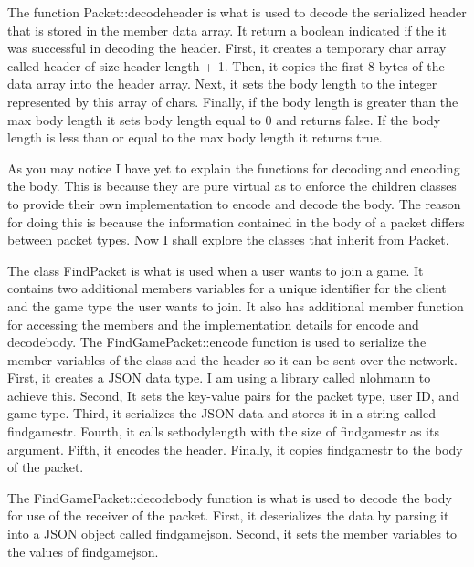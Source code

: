 \documentclass[conference]{IEEEtran}
\begin{document}
The function Packet::decode\textunderscore header is what is used to decode the serialized header that is stored in the member data array.
It return a boolean indicated if the it was successful in decoding the header.
First, it creates a temporary char array called header of size header length + 1.
Then, it copies the first 8 bytes of the data array into the header array.
Next, it sets the body length to the integer represented by this array of chars.
Finally, if the body length is greater than the max body length it sets body length equal to 0 and returns false.
If the body length is less than or equal to the max body length it returns true.

As you may notice I have yet to explain the functions for decoding and encoding the body.
This is because they are pure virtual as to enforce the children classes to provide their own implementation to encode and decode the body. 
The reason for doing this is because the information contained in the body of a packet differs between packet types.
Now I shall explore the classes that inherit from Packet.

The class FindPacket is what is used when a user wants to join a game.
It contains two additional members variables for a unique identifier for the client and the game type the user wants to join.
It also has additional member function for accessing the members and the implementation details for encode and decode\textunderscore body.
The FindGamePacket::encode function is used to serialize the member variables of the class and the header so it can be sent over the network.
First, it creates a JSON data type.
I am using a library called nlohmann to achieve this.\cite{b1}
Second, It sets the key-value pairs for the packet type, user ID, and game type.
Third, it serializes the JSON data and stores it in a string called find\textunderscore game\textunderscore str.
Fourth, it calls set\textunderscore body\textunderscore length with the size of find\textunderscore game\textunderscore str as its argument.
Fifth, it encodes the header.
Finally, it copies find\textunderscore game\textunderscore str to the body of the packet.

The  FindGamePacket::decode\textunderscore body function is what is used to decode the body for use of the receiver of the packet.
First, it deserializes the data by parsing it into a JSON object called find\textunderscore game\textunderscore json.
Second, it sets the member variables to the values of find\textunderscore game\textunderscore json.
\end{document}
